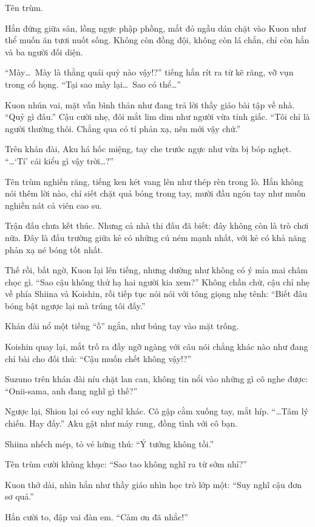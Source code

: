 \documentclass[../main.tex]{subfiles}
\begin{document}
Tên trùm.

Hắn đứng giữa sân, lồng ngực phập phồng, mắt đỏ ngầu dán chặt vào Kuon như thể muốn ăn tươi nuốt sống.   Không còn đồng đội, không còn lá chắn, chỉ còn hắn và ba người đối diện.

``Mày\dots\ Mày là thằng quái quỷ nào vậy!?'' tiếng hắn rít ra từ kẽ răng, vỡ vụn trong cổ họng. ``Tại sao mày lại\dots\ Sao có thể\dots''

Kuon nhún vai, mặt vẫn bình thản như đang trả lời thầy giáo bài tập về nhà. ``Quỷ gì đâu.'' Cậu cười nhẹ, đôi mắt lim dim như người vừa tỉnh giấc.  ``Tôi chỉ là người thường thôi. Chẳng qua có tí phản xạ, nên mới vậy chứ.''

Trên khán đài, Aku há hốc miệng, tay che trước ngực như vừa bị bóp nghẹt. ``\dots `Tí' cái kiểu gì vậy trời\dots?''

Tên trùm nghiến răng, tiếng ken két vang lên như thép rèn trong lò. Hắn không nói thêm lời nào, chỉ siết chặt quả bóng trong tay, mười đầu ngón tay như muốn nghiền nát cả viên cao su.

Trận đấu chưa kết thúc. Nhưng cả nhà thi đấu đã biết: đây không còn là trò chơi nữa. Đây là đấu trường giữa kẻ có những cú ném mạnh nhất, với kẻ có khả năng phản xạ né bóng tốt nhất.

Thế rồi, bất ngờ, Kuon lại lên tiếng, nhưng dường như không có ý mỉa mai châm chọc gì. ``Sao cậu không thử hạ hai người kia xem?'' Không chần chừ, cậu chỉ nhẹ về phía Shiina và Koishin, rồi tiếp tục nói nói với tông giọng nhẹ tênh: ``Biết đâu bóng bật ngược lại mà trúng tôi đấy.''

Khán đài nổ một tiếng ``ồ'' ngắn, như búng tay vào mặt trống.

Koishin quay lại, mắt trố ra đầy ngỡ ngàng với câu nói chẳng khác nào như đang chỉ bài cho đối thủ: ``Cậu muốn chết không vậy!?''

Suzuno trên khán đài níu chặt lan can, không tin nổi vào những gì cô nghe được: ``Onii-sama, anh đang nghĩ gì thế?''

Ngược lại, Shion lại có suy nghĩ khác. Cô gập cằm xuống tay, mắt híp. ``\dots Tâm lý chiến. Hay đấy.'' Aku gật như máy rung, đồng tình với cô bạn.

Shiina nhếch mép, tỏ vẻ hứng thú: ``Ý tưởng không tồi.''

Tên trùm cười khùng khục: ``Sao tao không nghĩ ra từ sớm nhỉ?''

Kuon thở dài, nhìn hắn như thầy giáo nhìn học trò lớp một: ``Suy nghĩ cậu đơn sơ quá.''

Hắn cười to, đập vai đàn em. ``Cảm ơn đã nhắc!''
\end{document}
